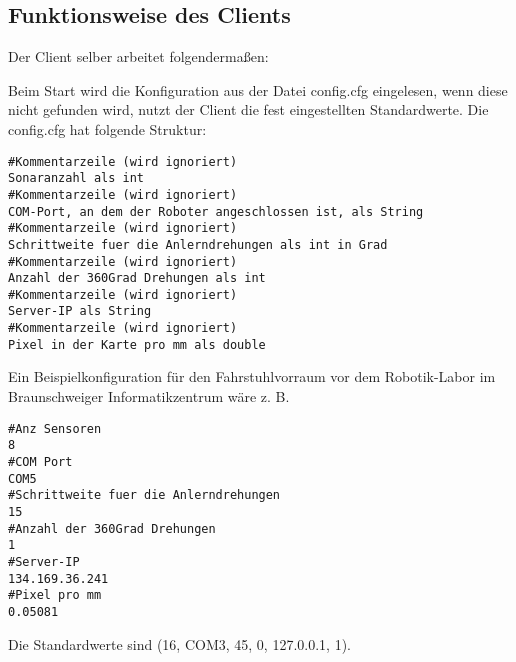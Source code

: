 \subsection{Funktionsweise des Clients}
\label{sec:funktionsweise}


Der Client selber arbeitet folgendermaßen:

Beim Start wird die Konfiguration aus der  Datei config.cfg eingelesen, wenn diese nicht gefunden
wird, nutzt der Client die fest eingestellten Standardwerte. Die config.cfg
hat folgende Struktur:

\begin{lstlisting}[captionpos=b,caption={Aufbau der config.cfg},label={aufbau_config}]
#Kommentarzeile (wird ignoriert)
Sonaranzahl als int
#Kommentarzeile (wird ignoriert)
COM-Port, an dem der Roboter angeschlossen ist, als String
#Kommentarzeile (wird ignoriert)
Schrittweite fuer die Anlerndrehungen als int in Grad
#Kommentarzeile (wird ignoriert)
Anzahl der 360Grad Drehungen als int
#Kommentarzeile (wird ignoriert)
Server-IP als String
#Kommentarzeile (wird ignoriert)
Pixel in der Karte pro mm als double
\end{lstlisting}

Ein Beispielkonfiguration für den Fahrstuhlvorraum vor dem
Robotik-Labor im Braunschweiger Informatikzentrum wäre z. B.
\begin{lstlisting}[captionpos=b,caption={Ein Beispiel für eine komplette config.cfg},label={beispiel_config}]
#Anz Sensoren
8
#COM Port
COM5
#Schrittweite fuer die Anlerndrehungen
15
#Anzahl der 360Grad Drehungen
1
#Server-IP
134.169.36.241
#Pixel pro mm
0.05081
\end{lstlisting}
Die Standardwerte sind (16, COM3, 45, 0, 127.0.0.1, 1).

